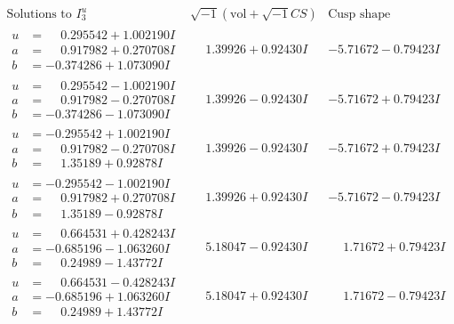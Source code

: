 \documentclass[1p]{elsarticle_modified}
\theoremstyle{definition}
\newcommand{\I}{\sqrt{-1}}
\begin{document}
$$\begin{array}{c|c|c}  
\text{Solutions to }I^u_{3}& \I (\text{vol} + \sqrt{-1}CS) & \text{Cusp shape}\\
 \hline 
\begin{aligned}
u &= \phantom{-}0.295542 + 1.002190 I \\
a &= \phantom{-}0.917982 + 0.270708 I \\
b &= -0.374286 + 1.073090 I\end{aligned}
 & \phantom{-}1.39926 + 0.92430 I & -5.71672 - 0.79423 I \\ \hline\begin{aligned}
u &= \phantom{-}0.295542 - 1.002190 I \\
a &= \phantom{-}0.917982 - 0.270708 I \\
b &= -0.374286 - 1.073090 I\end{aligned}
 & \phantom{-}1.39926 - 0.92430 I & -5.71672 + 0.79423 I \\ \hline\begin{aligned}
u &= -0.295542 + 1.002190 I \\
a &= \phantom{-}0.917982 - 0.270708 I \\
b &= \phantom{-}1.35189 + 0.92878 I\end{aligned}
 & \phantom{-}1.39926 - 0.92430 I & -5.71672 + 0.79423 I \\ \hline\begin{aligned}
u &= -0.295542 - 1.002190 I \\
a &= \phantom{-}0.917982 + 0.270708 I \\
b &= \phantom{-}1.35189 - 0.92878 I\end{aligned}
 & \phantom{-}1.39926 + 0.92430 I & -5.71672 - 0.79423 I \\ \hline\begin{aligned}
u &= \phantom{-}0.664531 + 0.428243 I \\
a &= -0.685196 - 1.063260 I \\
b &= \phantom{-}0.24989 - 1.43772 I\end{aligned}
 & \phantom{-}5.18047 - 0.92430 I & \phantom{-}1.71672 + 0.79423 I \\ \hline\begin{aligned}
u &= \phantom{-}0.664531 - 0.428243 I \\
a &= -0.685196 + 1.063260 I \\
b &= \phantom{-}0.24989 + 1.43772 I\end{aligned}
 & \phantom{-}5.18047 + 0.92430 I & \phantom{-}1.71672 - 0.79423 I \\ \hline\begin{aligned}

\end{aligned}
\end{array}$$
\end{document}
